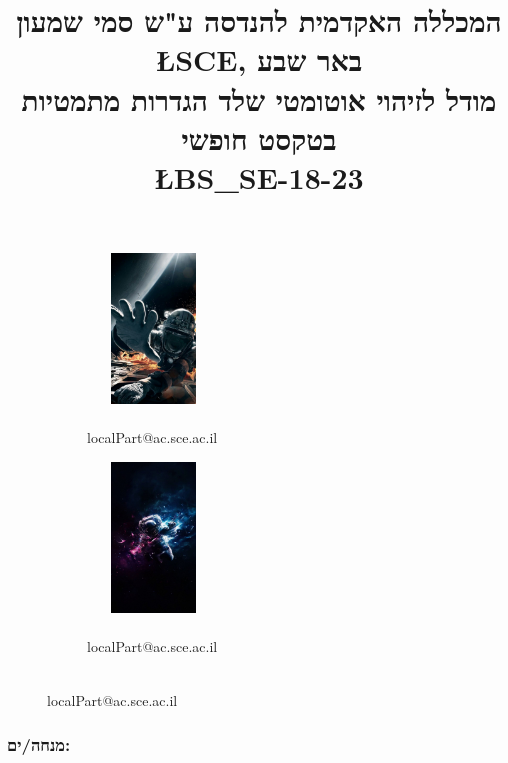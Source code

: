 \documentclass[11pt]{article}
\title{%
\small
המכללה האקדמית להנדסה ע"ש סמי שמעון \L{SCE}, באר שבע\\ \vspace{+1em}
\Large
מודל לזיהוי אוטומטי שלד
הגדרות מתמטיות בטקסט
חופשי\\
\L{BS\_SE-18-23}\vspace{-3.5em}}
\date{}
\date{}
\begin{document}
\maketitle
{}
\begin{figure}[h]
   \centering
    \begin{subfigure}[b]{0.4\textwidth}
        \centering
        \includegraphics[height=40mm, width=35mm]{pic1.jpg}
        \caption*{\\ localPart@ac.sce.ac.il}
    \end{subfigure}
    \quad
    \begin{subfigure}[b]{0.4\textwidth} 
        \centering 
        \includegraphics[height=40mm, width=35mm]{pic2.jpg}
        \caption*{\\ localPart@ac.sce.ac.il}
    \end{subfigure}
\end{figure}
\thispagestyle{empty}

\subsubsection*{מנחה/ים:}
\end{document}
